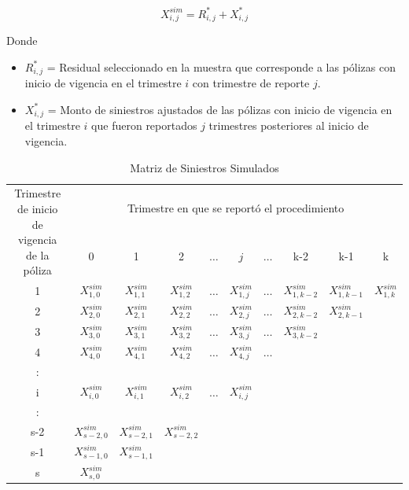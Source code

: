 \documentclass[11pt,twoside,openright,spanish]{report}
\numberwithin{equation}{chapter}
\numberwithin{figure}{chapter}
\numberwithin{table}{chapter}
\begin{document}
	\begin{equation}
    X_{i,j}^{sim}=R_{i,j}^{*}+X_{i,j}^{*} 
\label{eq8}    
\end{equation}
	
	\vspace{0.1cm}
	
	Donde
	
	\vspace{0.1cm}
	
	\begin{itemize}
		\setlength\itemsep{-0.5em}
		\item $R_{i,j}^{*}$ = Residual seleccionado en la muestra que corresponde a las pólizas con inicio de vigencia en el trimestre $i$ con trimestre de reporte $j$.
		\item $X_{i,j}^{*}$ = Monto de siniestros ajustados de las pólizas con inicio de vigencia en el trimestre $i$ que fueron reportados $j$ trimestres posteriores al inicio de vigencia.
		\end{itemize}
	
	
	\begin{table}[H]
		\centering
		\begin{tabularx}{\linewidth}{ c|ccccccccc}
			\multirow{2}{4cm}{Trimestre de inicio de vigencia de la póliza}& \multicolumn{9}{c}{Trimestre en que se reportó el procedimiento} \\
			& 0  & 1 & 2 & $ \dots $ & $j$ & $\dots $ & k-2 & k-1 &  k \\
			\midrule
			1      &  $X_{1,0}^{sim}$ & $X_{1,1}^{sim}$ & $X_{1,2}^{sim}$ & $ \dots $ & $X_{1,j}^{sim}$ & $ \dots $ & $X_{1,k-2}^{sim}$ & $X_{1,k-1}^{sim}$ & $X_{1,k}^{sim}$ \\
			2      &  $X_{2,0}^{sim}$ & $X_{2,1}^{sim}$ & $X_{2,2}^{sim}$ & $ \dots $ & $X_{2,j}^{sim}$ & $ \dots $ & $X_{2,k-2}^{sim}$ & $X_{2,k-1}^{sim}$ & \\
			3      &  $X_{3,0}^{sim}$ & $X_{3,1}^{sim}$ & $X_{3,2}^{sim}$ & $ \dots $ & $X_{3,j}^{sim}$ & $ \dots $ & $X_{3,k-2}^{sim}$ & & \\
			4      &  $X_{4,0}^{sim}$ & $X_{4,1}^{sim}$ & $X_{4,2}^{sim}$ & $ \dots $ & $X_{4,j}^{sim}$ & $ \dots $ & & & \\
			:      & & & & & & & & &\\
			i      &  $X_{i,0}^{sim}$ & $X_{i,1}^{sim}$ & $X_{i,2}^{sim}$ & $ \dots $ & $X_{i,j}^{sim}$ & & & & \\
			:      & & & & & & & & & \\
			s-2      &  $X_{s-2,0}^{sim}$ & $X_{s-2,1}^{sim}$ & $X_{s-2,2}^{sim}$ & & & & & & \\
			s-1      &  $X_{s-1,0}^{sim}$ & $X_{s-1,1}^{sim}$ & & & & & & & \\
			s      &  $X_{s,0}^{sim}$ & & & & & & & & \\
		\end{tabularx}
	\caption{Matriz de Siniestros Simulados}
	\label{matrix8}
	\end{table}
\end{document}
